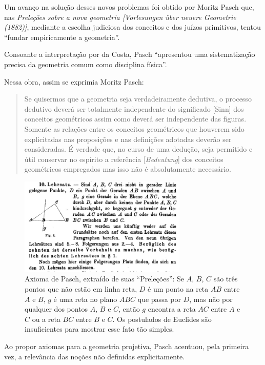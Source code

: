 \documentclass{hipatia}
\begin{document}
Um avanço na solução desses novos problemas foi obtido por Moritz Pasch que, nas \emph{Preleções sobre a nova geometria [Vorlesungen über neuere Geometrie (1882)]}, mediante a escolha judiciosa dos conceitos e dos juízos primitivos, tentou ``fundar empiricamente a geometria''. \cite[p. 151]{pasch1924} 



Consoante a interpretação por da Costa, Pasch ``apresentou uma sistematização precisa da geometria comum como disciplina física''.  \cite[p. 193]{costa1994}


Nessa obra, assim se exprimia Moritz Pasch: 
\begin{quote}   
Se quisermos que a geometria seja verdadeiramente dedutiva, o processo dedutivo deverá ser totalmente independente do significado [Sinn] dos conceitos geométricos assim como deverá ser independente das figuras. Somente as relações entre os conceitos geométricos que houverem sido explicitadas nas proposições e nas definições adotadas deverão ser consideradas. É verdade que, no curso de uma dedução, seja permitido e útil conservar no espírito a referência [\emph{Bedeutung}] dos conceitos geométricos empregados mas isso não é absolutamente necessário.  
\cite[\emph{apud}, p. 283]{bottazzini2001}\cite[\emph{apud}, p. 654]{gandon2005}
\end{quote}

\begin{figure}[htb!]
    \includegraphics[width=8cm]{pasch.jpg}
 \caption*{Axioma de Pasch, extraído de suas ``Preleções'': Se $A$, $B$, $C$ são três pontos que não estão em linha reta, $D$ é um ponto na reta $AB$ entre $A$ e $B$, $g$ é uma reta no plano $ABC$ que passa por $D$, mas não por qualquer dos pontos $A$, $B$ e $C$, então $g$ encontra a reta $AC$ entre $A$ e $C$ ou a reta $BC$ entre $B$ e $C$. Os postulados de Euclides são insuficientes para mostrar esse fato tão simples. }   
\end{figure}

Ao propor axiomas para a geometria projetiva, Pasch acentuou, pela primeira vez, a relevância das noções não definidas explicitamente. \cite[p. 859]{kleiner1999}
\end{document}
